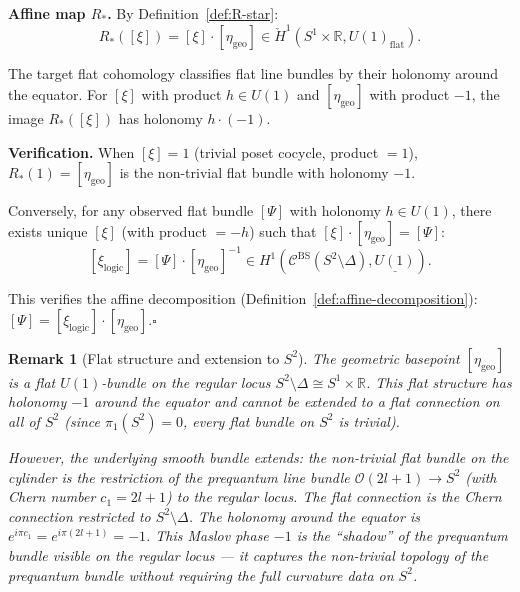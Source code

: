 \documentclass[11pt]{article}
\newtheorem{remark}[theorem]{Remark}
\begin{document}
\textbf{Affine map $R_*$.}
By Definition~\ref{def:R-star}:
\[
R_*([\xi]) = [\xi] \cdot [\eta_{\mathrm{geo}}]
\in \check{H}^1(S^1 \times \mathbb{R}, U(1)_{\mathrm{flat}}).
\]

The target flat cohomology classifies flat line bundles by their holonomy
around the equator. For $[\xi]$ with product $h \in U(1)$ and
$[\eta_{\mathrm{geo}}]$ with product $-1$, the image $R_*([\xi])$ has
holonomy $h \cdot (-1)$.

\textbf{Verification.}
When $[\xi] = 1$ (trivial poset cocycle, product $= 1$), $R_*(1) = [\eta_{\mathrm{geo}}]$
is the non-trivial flat bundle with holonomy $-1$.

Conversely, for any observed flat bundle $[\Psi]$ with holonomy $h \in U(1)$,
there exists unique $[\xi]$ (with product $= -h$) such that
$[\xi] \cdot [\eta_{\mathrm{geo}}] = [\Psi]$:
\[
[\xi_{\mathrm{logic}}] = [\Psi] \cdot [\eta_{\mathrm{geo}}]^{-1}
\in H^1(\mathcal{C}^{\mathrm{BS}}(S^2 \setminus \Delta), \underline{U(1)}).
\]

This verifies the affine decomposition (Definition~\ref{def:affine-decomposition}):
$[\Psi] = [\xi_{\mathrm{logic}}] \cdot [\eta_{\mathrm{geo}}]$.$\square$

\begin{remark}[Flat structure and extension to $S^2$]
The geometric basepoint $[\eta_{\mathrm{geo}}]$ is a flat $U(1)$-bundle
on the regular locus $S^2 \setminus \Delta \cong S^1 \times \mathbb{R}$.
This flat structure has holonomy $-1$ around the equator and cannot be
extended to a flat connection on all of $S^2$ (since $\pi_1(S^2) = 0$,
every flat bundle on $S^2$ is trivial).

However, the underlying \emph{smooth} bundle extends: the non-trivial
flat bundle on the cylinder is the restriction of the prequantum
line bundle $\mathcal{O}(2l+1) \to S^2$ (with Chern number $c_1 = 2l+1$)
to the regular locus. The flat connection is the Chern connection
restricted to $S^2 \setminus \Delta$. The holonomy around the equator is
$e^{i\pi c_1} = e^{i\pi(2l+1)} = -1$. This Maslov phase $-1$ is the ``shadow''
of the prequantum bundle visible on the regular locus --- it captures the
non-trivial topology of the prequantum bundle without requiring the full
curvature data on $S^2$.
\end{remark}
\end{document}
